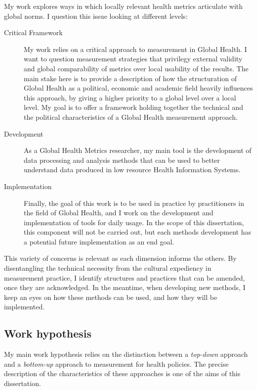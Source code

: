 My work explores ways in which locally relevant health metrics articulate with global norms. I question this issue looking at different levels:

\begin{description}
\item[Critical Framework] My work relies on a critical approach to measurement in Global Health. I want to question measurement strategies that privilegy external validity and global comparability of metrics over local usability of the results. The main stake here is to provide a description of how the structuration of Global Health as a political, economic and academic field heavily influences this approach, by giving a higher priority to a global level over a local level. My goal is to offer a framework holding together the technical and the political characteristics of a Global Health measurement approach.
\item[Development] As a Global Health Metrics researcher, my main tool is the development of data processing and analysis methods that can be used to better understand data produced in low resource Health Information Systems.
\item[Implementation] Finally, the goal of this work is to be used in practice by practitioners in the field of Global Health, and I work on the development and implementation of tools for daily usage. In the scope of this dissertation, this component will not be carried out, but each methods development has a potential future implementation as an end goal.
\end{description}

This variety of concerns is relevant as each dimension informs the others. By disentangling the technical necessity from the cultural expediency in measurement practice, I identify structures and practices that can be amended, once they are acknowledged. In the meantime, when developing new methods, I keep an eyes on how these methods can be used, and how they will be implemented.


\subsection{Work hypothesis}

My main work hypothesis relies on the distinction between a \textit{top-down} approach and a \textit{bottom-up} approach to measurement for health policies. The precise description of the characteristics of these approaches is one of the aims of this dissertation.

